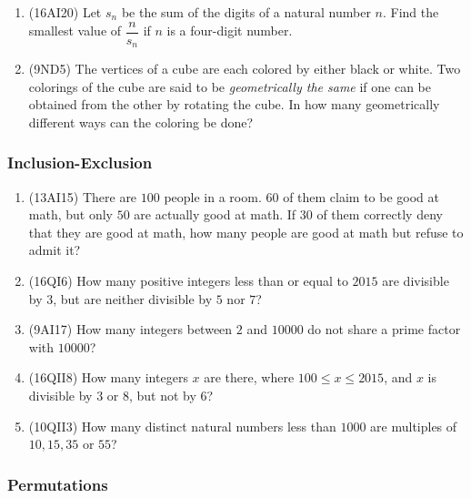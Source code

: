 \documentclass[10pt,paper=letter]{scrartcl}
\begin{document}
\begin{enumerate}
\item (16AI20) Let $s_n$ be the sum of the digits of a natural number $n$. Find the smallest value of $\dfrac{n}{s_n}$ if $n$ is a four-digit number.

\item (9ND5) The vertices of a cube are each colored by either black or white. Two colorings of the cube are said to be \emph{geometrically the same} if one can be obtained from the other by rotating the cube. In how many geometrically different ways can the coloring be done?

\end{enumerate}

\subsubsection*{Inclusion-Exclusion}

\begin{enumerate}

\item (13AI15) There are $100$ people in a room. $60$ of them claim to be good at math, but only $50$ are actually good at math. If $30$ of them correctly deny that they are good at math, how many people are good at math but refuse to admit it?

\item (16QI6) How many positive integers less than or equal to $2015$ are divisible by $3$, but are neither divisible by $5$ nor $7$?

\item (9AI17) How many integers between $2$ and $10000$ do not share a prime factor with $10000$?

\item (16QII8) How many integers $x$ are there, where $100 \leq x \leq 2015$, and $x$ is divisible by $3$ or $8$, but not by $6$?

\item (10QII3) How many distinct natural numbers less than $1000$ are multiples of $10, 15, 35$ or $55$?

\end{enumerate}

\subsubsection*{Permutations}
\end{document}
